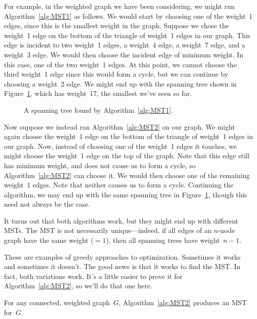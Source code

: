 For example, in the weighted graph we have been considering, we might
run Algorithm~\ref{alg:MST1} as follows.  We would start by choosing
one of the weight~1 edges, since this is the smallest weight in the
graph.  Suppose we chose the weight~1 edge on the bottom of the
triangle of weight~1 edges in our graph.  This edge is incident to two
weight~1 edges, a weight~4 edge, a weight~7 edge, and a weight~3
edge.  We would then choose the incident edge of minimum weight.  In
this case, one of the two weight~1 edges.  At this point, we cannot
choose the third weight~1 edge since this would form a cycle, but we
can continue by choosing a weight~2 edge.  We might end up with the
spanning tree shown in Figure~\ref{fig:5KC}, which has weight~17, the
smallest we've seen so far.

\begin{figure}

\missinggraphic

\caption{A spanning tree found by Algorithm~\ref{alg:MST1}.}

\label{fig:5KC}

\end{figure}

Now suppose we instead ran Algorithm~\ref{alg:MST2} on our graph.  We
might again choose the weight~1 edge on the bottom of the triangle of
weight~1 edges in our graph.  Now, instead of choosing one of the
weight~1 edges it touches, we might choose the weight~1 edge on the
top of the graph.  Note that this edge still has minimum weight, and
does not cause us to form a cycle, so Algorithm~\ref{alg:MST2} can
choose it.  We would then choose one of the remaining weight~1 edges.
Note that neither causes us to form a cycle.  Continuing the
algorithm, we may end up with the same spanning tree in
Figure~\ref{fig:5KC}, though this need not always be the case.

It turns out that both algorithms work, but they might end up with
different MSTs.  The MST is not necessarily unique---indeed, if all
edges of an $n$-node graph have the same weight (${}=1$), then all
spanning trees have weight~$n - 1$.

These are examples of greedy approaches to optimization.  Sometimes it
works and sometimes it doesn't.  The good news is that it works to
find the MST\@.  In fact, both variations work.  It's a little easier
to prove it for Algorithm~\ref{alg:MST2}, so we'll do that one here.

\begin{theorem}\label{thm:MST2}
For any connected, weighted graph~$G$, Algorithm~\ref{alg:MST2}
produces an MST for~$G$.
\end{theorem}

